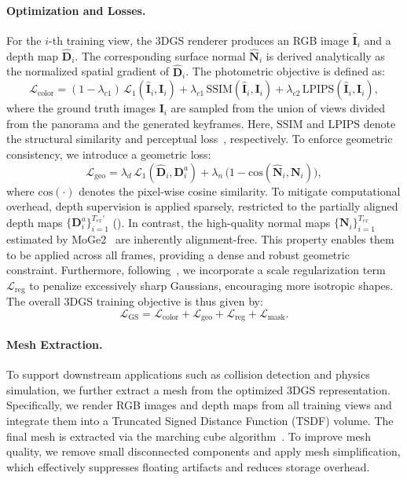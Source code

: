\documentclass{article} %
\begin{document}
\paragraph{Optimization and Losses.}
For the $i$-th training view, the 3DGS renderer produces an RGB image $\hat{\mathbf{I}}_i$ and a depth map $\hat{\mathbf{D}}_i$. The corresponding surface normal $\hat{\mathbf{N}}_i$ is derived analytically as the normalized spatial gradient of $\hat{\mathbf{D}}_i$. The photometric objective is defined as:
\begin{equation}
\mathcal{L}_{\text{color}} = (1 - \lambda_{c1}) \, \mathcal{L}_1(\hat{\mathbf{I}}_i, \mathbf{I}_i) 
+ \lambda_{c1} \, \text{SSIM}(\hat{\mathbf{I}}_i, \mathbf{I}_i) 
+ \lambda_{c2} \, \text{LPIPS}(\hat{\mathbf{I}}_i, \mathbf{I}_i),
\label{eq:L_c}
\end{equation}
where the ground truth images $\mathbf{I}_i$ are sampled from the union of views divided from the panorama and the generated keyframes. Here, $\text{SSIM}$ and $\text{LPIPS}$ denote the structural similarity and perceptual loss~\cite{johnson2016perceptual}, respectively. 
To enforce geometric consistency, we introduce a geometric loss:
\begin{equation}
\mathcal{L}_{\text{geo}} = \lambda_d \, \mathcal{L}_1(\hat{\mathbf{D}}_i, \mathbf{D}^a_i) 
+ \lambda_n \, \big(1 - \text{cos}(\hat{\mathbf{N}}_i, \mathbf{N}_i)\big),
\label{eq:L_g}
\end{equation}
where $\text{cos}(\cdot)$ denotes the pixel-wise cosine similarity. To mitigate computational overhead, depth supervision is applied sparsely, restricted to the partially aligned depth maps $\{\mathbf{D}^a_i\}_{i=1}^{T_{ex}'}$ (). 
In contrast, the high-quality normal maps $\{\mathbf{N}_i\}_{i=1}^{T_{ex}}$ estimated by MoGe2~\cite{wang2025moge} are inherently alignment-free.
This property enables them to be applied across all frames, providing a dense and robust geometric constraint. 
Furthermore, following~\cite{xie2024physgaussian}, we incorporate a scale regularization term $\mathcal{L}_{\text{reg}}$ to penalize excessively sharp Gaussians, encouraging more isotropic shapes. The overall 3DGS training objective is thus given by:
\begin{equation}
\mathcal{L}_{\text{GS}} = \mathcal{L}_{\text{color}} + \mathcal{L}_{\text{geo}} + \mathcal{L}_{\text{reg}} + \mathcal{L}_{\text{mask}}.
\end{equation}

\paragraph{Mesh Extraction.}
To support downstream applications such as collision detection and physics simulation, we further extract a mesh from the optimized 3DGS representation. Specifically, we render RGB images and depth maps from all training views and integrate them into a Truncated Signed Distance Function (TSDF) volume. The final mesh is extracted via the marching cube algorithm~\cite{lorensen1998marching}. To improve mesh quality, we remove small disconnected components and apply mesh simplification, which effectively suppresses floating artifacts and reduces storage overhead.
\end{document}
